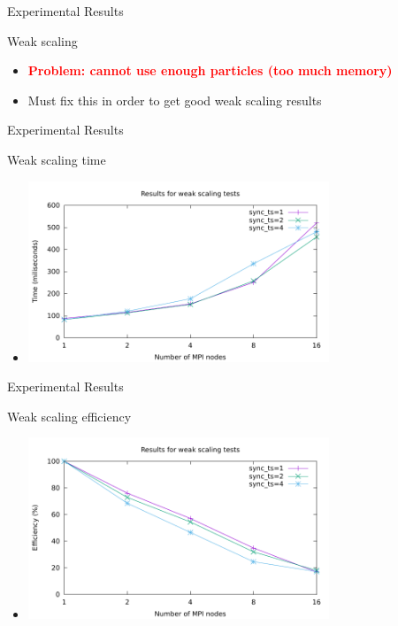 \documentclass[aspectratio=43,t]{beamer}
\begin{document}
  \begin{frame}{Experimental Results}
    \begin{block}{Weak scaling}
      \begin{itemize}
        \item \textcolor{red}{\textbf{Problem: cannot use enough particles (too much memory)}}
        \item Must fix this in order to get good weak scaling results
      \end{itemize}
    \end{block}
  \end{frame}

  \begin{frame}{Experimental Results}
    \begin{block}{Weak scaling time}
      \begin{itemize}
        \item \includegraphics[width=9cm]{results/weak_scaling.pdf}
      \end{itemize}
    \end{block}
  \end{frame}

  \begin{frame}{Experimental Results}
    \begin{block}{Weak scaling efficiency}
      \begin{itemize}
        \item \includegraphics[width=9cm]{results/weak_scaling_eff.pdf}
      \end{itemize}
    \end{block}
  \end{frame}
\end{document}
